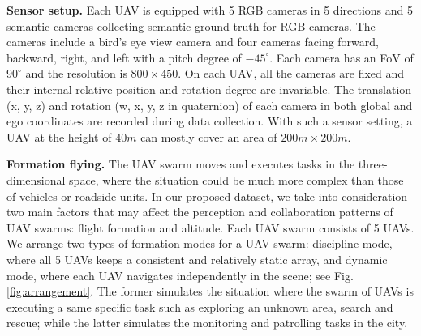 \documentclass{article}
\begin{document}
\textbf{Sensor setup.}
Each UAV is equipped with 5 RGB cameras in 5 directions and 5 semantic cameras collecting semantic ground truth for RGB cameras. The cameras include a bird's eye view camera and four cameras facing forward, backward, right, and left with a pitch degree of $-45^\circ$. Each camera has an FoV of $90^\circ$ and the resolution is $800 \times 450$. On each UAV, all the cameras are fixed and their internal relative position and rotation degree are invariable. The translation (x, y, z) and rotation (w, x, y, z in quaternion) of each camera in both global and ego coordinates are recorded during data collection. With such a sensor setting, a UAV at the height of $40m$ can mostly cover an area of $200m \times 200m$.



\textbf{Formation flying.}
The UAV swarm moves and executes tasks in the three-dimensional space, where the situation could be much more complex than those of vehicles or roadside units. In our proposed dataset, we take into consideration two main factors that may affect the perception and collaboration patterns of UAV swarms: flight formation and altitude. Each UAV swarm consists of 5 UAVs. We arrange two types of formation modes for a UAV swarm: discipline mode, where all 5 UAVs keeps a consistent and relatively static array, and dynamic mode, where each UAV navigates independently in the scene; see Fig. \ref{fig:arrangement}. The former simulates the situation where the swarm of UAVs is executing a same specific task such as exploring an unknown area, search and rescue; while the latter simulates the monitoring and patrolling tasks in the city. 
\end{document}
